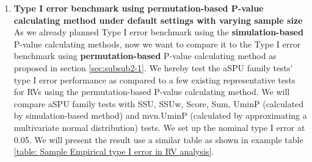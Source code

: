 \documentclass[12pt]{article}
\begin{document}
\begin{enumerate}
\item \textbf{Type I error benchmark using permutation-based P-value calculating method under default settings with varying sample size}\\
As we already planned Type I error benchmark using the \textbf{simulation-based} P-value calculating methods, now we want to compare it to the Type I error benchmark using \textbf{permutation-based} P-value calculating method as proposed in section \ref{sec:subsub2-1}. We hereby test the aSPU family tests' type I error performance as compared to a few existing representative tests for RVs using the permutation-based P-value calculating method. We will compare aSPU family tests with SSU, SSUw, Score, Sum, UminP (calculated by simulation-based method) and mvn.UminP (calculated by approximating a multivariate normal distribution) tests. We set up the nominal type I error at 0.05. We will present the result use a similar table as shown in example table \ref{table: Sample Empirical type I error in RV analysis}.
%
% 

\end{enumerate}
\end{document}
